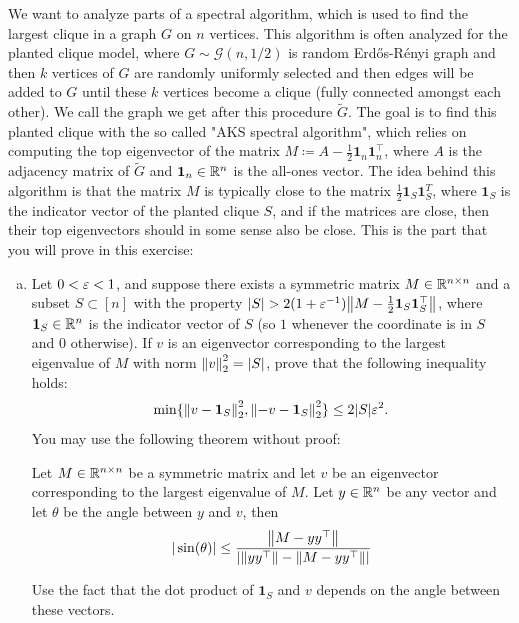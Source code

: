 \begin{myexercise}
    \label{prob:spectral_planted_clique}

    We want to analyze parts of a spectral algorithm, which is used to find the largest clique in a graph $G$ on $n$ vertices. This algorithm is often analyzed for the planted clique model, where $G \sim \mathcal{G}(n,1/2)$ is random Erd\H{o}s-R\'enyi graph and then $k$ vertices of $G$ are randomly uniformly selected and then edges will be added to $G$ until these $k$ vertices become a clique (fully connected amongst each other). We call the graph we get after this procedure $\tilde{G}$. The goal is to find this planted clique with the so called "AKS spectral algorithm", which relies on computing the top eigenvector of the matrix $M \coloneqq A - \frac12 \mathbf{1}_n\mathbf{1}_n^\top$, where $A$ is the adjacency matrix of $\tilde{G}$ and $\mathbf{1}_n \in \mathbb{R}^n$ is the all-ones vector. The idea behind this algorithm is that the matrix $M$ is typically close to the matrix $\frac 12 \mathbf{1}_S \mathbf{1}_S^T$, where $\mathbf{1}_S$ is the indicator vector of the planted clique $S$, and if the matrices are close, then their top eigenvectors should in some sense also be close. This is the part that you will prove in this exercise:
    \begin{enumerate}[(a)]
        \item Let $0<  \varepsilon < 1$, and suppose there exists a symmetric matrix $M \in \mathbb{R}^{n \times n}$ and a subset $S \subset [n]$ with the property $|S| > 2(1+ \varepsilon^{-1}){\left\lVert{M- \frac12 \mathbf{1}_S \mathbf{1}_S^\top}\right\rVert}$, where $\mathbf{1}_S \in \mathbb{R}^n$ is the indicator vector of $S$ (so $1$ whenever the coordinate is in $S$ and $0$ otherwise). If $v$ is an eigenvector corresponding to the largest eigenvalue of $M$ with norm ${\left\lVert{v}\right\rVert}_2^2 = |S|$, prove that the following inequality holds:
        $$ \min \{ {\left\lVert{v - \mathbf{1}_S}\right\rVert}_2^2 , {\left\lVert{-v - \mathbf{1}_S}\right\rVert}_2^2 \} \leq 2|S| \varepsilon^2.$$
        You may use the following theorem without proof:
        \begin{theorem}
            Let $M \in \mathbb{R}^{n \times n}$ be a symmetric matrix and let $v$ be an eigenvector corresponding to the largest eigenvalue of $M$. Let $y \in \mathbb{R}^n$ be any vector and let $\theta$ be the angle between $y$ and $v$, then
            $$ |\sin(\theta)| \leq \frac{{\left\lVert{M-  yy^\top}\right\rVert}}{|{\left\lVert{yy^\top}\right\rVert} - {\left\lVert{M-  yy^\top}\right\rVert}|}$$
        \end{theorem} 

        

    \begin{hint}
        Use the fact that the dot product of $\mathbf{1}_S$ and $v$ depends on the angle between these vectors.
    \end{hint}
    \end{enumerate}
\end{myexercise}




